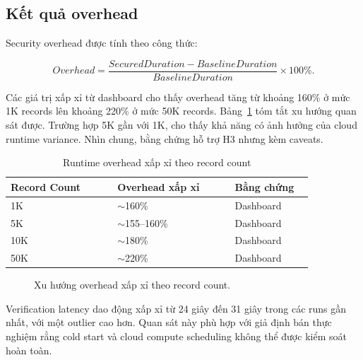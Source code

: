 \subsection{Kết quả overhead}

Security overhead được tính theo công thức:

\begin{equation}
Overhead = \frac{SecuredDuration - BaselineDuration}{BaselineDuration} \times 100\%.
\end{equation}

Các giá trị xấp xỉ từ dashboard cho thấy overhead tăng từ khoảng 160\% ở mức 1K records lên khoảng 220\% ở mức 50K records. Bảng~\ref{tab:overhead} tóm tắt xu hướng quan sát được. Trường hợp 5K gần với 1K, cho thấy khả năng có ảnh hưởng của cloud runtime variance. Nhìn chung, bằng chứng hỗ trợ H3 nhưng kèm caveats.

\begin{table}[t]
\caption{Runtime overhead xấp xỉ theo record count}
\centering
\begin{tabular}{p{0.30\linewidth}p{0.33\linewidth}p{0.22\linewidth}}
\toprule
\textbf{Record Count} & \textbf{Overhead xấp xỉ} & \textbf{Bằng chứng} \\
\midrule
1K & $\sim$160\% & Dashboard \\
5K & $\sim$155--160\% & Dashboard \\
10K & $\sim$180\% & Dashboard \\
50K & $\sim$220\% & Dashboard \\
\bottomrule
\end{tabular}
\label{tab:overhead}
\end{table}

\begin{figure}[t]
\centering
{}
\caption{Xu hướng overhead xấp xỉ theo record count.}
\label{fig:overhead}
\end{figure}

Verification latency dao động xấp xỉ từ 24 giây đến 31 giây trong các runs gần nhất, với một outlier cao hơn. Quan sát này phù hợp với giả định bán thực nghiệm rằng cold start và cloud compute scheduling không thể được kiểm soát hoàn toàn.

